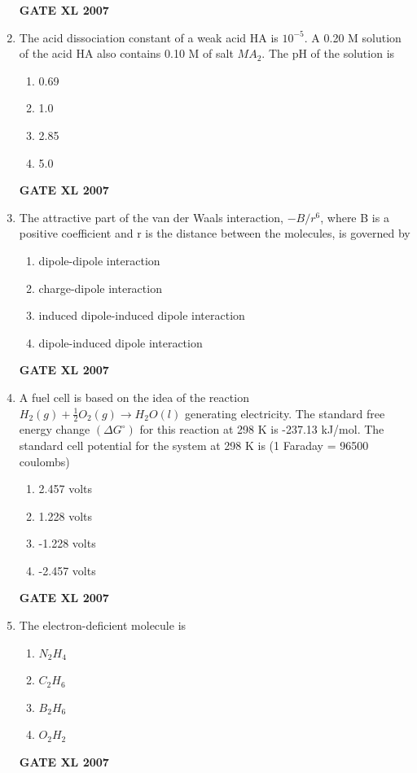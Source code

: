 \documentclass[journal,12pt,onecolumn]{IEEEtran}
\begin{document}
\begin{enumerate}[resume]
	    \hfill \textbf{GATE XL 2007}
    \item The acid dissociation constant of a weak acid HA is $10^{-5}$. A 0.20 M solution of the acid HA also contains 0.10 M of salt $MA_{2}$. The pH of the solution is 
    \begin{multicols}{4}
        \begin{enumerate} 
            \item 0.69
            \item 1.0
            \item 2.85
            \item 5.0
        \end{enumerate}
    \end{multicols}

	    \hfill \textbf{GATE XL 2007}
    \item The attractive part of the van der Waals interaction, $-B/r^{6}$, where B is a positive coefficient and r is the distance between the molecules, is governed by 
        \begin{enumerate} 
            \item dipole-dipole interaction
            \item charge-dipole interaction
            \item induced dipole-induced dipole interaction
            \item dipole-induced dipole interaction
        \end{enumerate}
	    \hfill \textbf{GATE XL 2007}

    \item A fuel cell is based on the idea of the reaction $H_{2}(g)+\frac{1}{2}O_{2}(g)\rightarrow H_{2}O(l)$ generating electricity. The standard free energy change $(\Delta G^{\circ})$ for this reaction at 298 K is -237.13 kJ/mol. The standard cell potential for the system at 298 K is (1 Faraday = 96500 coulombs) 
    \begin{multicols}{4}
        \begin{enumerate} 
            \item 2.457 volts
            \item 1.228 volts
            \item -1.228 volts
            \item -2.457 volts
        \end{enumerate}
    \end{multicols}

	    \hfill \textbf{GATE XL 2007}
    \item The electron-deficient molecule is 
    \begin{multicols}{4}
        \begin{enumerate} 
            \item $N_{2}H_{4}$
            \item $C_{2}H_{6}$
            \item $B_{2}H_{6}$
            \item $O_{2}H_{2}$
        \end{enumerate}
    \end{multicols}
	    \hfill \textbf{GATE XL 2007}


\end{enumerate}
\end{document}
